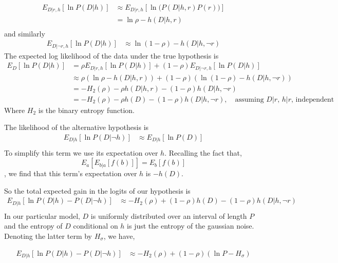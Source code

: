 \begin{align*}
E_{D | r, h} \left[ \ln P(D | h) \right] &\approx E_{D | r, h} \left[ \ln \Big( P(D | h, r) P(r) \Big) \right] \\
&= \ln \rho - h(D | h, r) \\
\end{align*}
and similarly
\begin{align*}
E_{D | \neg r, h} \left[ \ln P(D | h) \right] &\approx \ln (1 - \rho) - h(D | h, \neg r)
\end{align*}
The expected log likelihood of the data under the true hypothesis is
\begin{align*}
E_D \left[ \ln P(D | h) \right] &= \rho E_{D | r, h} \left[ \ln P(D | h) \right] + (1 - \rho) E_{D | \neg r, h} \left[ \ln P(D | h) \right] \\
&\approx \rho (\ln \rho - h(D | h, r)) + (1 - \rho) (\ln (1 - \rho) - h(D | h, \neg r)) \\
&= - H_2(\rho) - \rho h(D | h, r) - (1 - \rho) h(D | h, \neg r) \\
&= - H_2(\rho) - \rho h(D) - (1 - \rho) h(D | h, \neg r), \quad \text{assuming $D|r$, $h|r$, independent}
\end{align*}
Where $H_2$ is the binary entropy function.

The likelihood of the alternative hypothesis is
\begin{align*}
E_{D | h}\left[ \ln P(D | \neg h) \right] &\approx E_{D | h} \left[ \ln P(D) \right] \\
\end{align*}
To simplify this term we use its expectation over $h$.
Recalling the fact that,
$$ E_a \left[ E_{b | a} [f(b)] \right] = E_b [f(b)] $$,
we find that this term's expectation over $h$ is $-h(D)$.

So the total expected gain in the logits of our hypothesis is
\begin{align*}
E_{D | h}[\ln P(D | h) - P(D | \neg h)] &\approx - H_2(\rho) + (1 - \rho) h(D) - (1 - \rho) h(D | h, \neg r) \\
\end{align*}
In our particular model, $D$ is uniformly distributed over an interval of length $P$ and
the entropy of $D$ conditional on $h$ is just the entropy of the gaussian noise.
Denoting the latter term by $H_{\sigma}$, we have,

\begin{align*}
E_{D | h}[\ln P(D | h) - P(D | \neg h)] &\approx - H_2(\rho) + (1 - \rho) (\ln P - H_{\sigma})
\end{align*}

